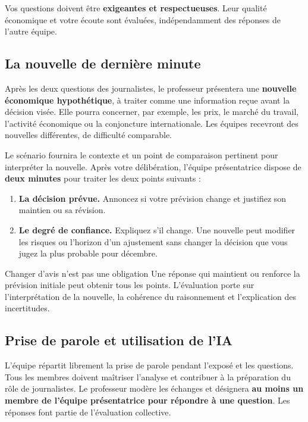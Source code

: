\documentclass[11pt,letterpaper]{article}
\begin{document}
Vos questions doivent être \textbf{exigeantes et respectueuses}. Leur qualité économique et votre écoute sont évaluées, indépendamment des réponses de l'autre équipe.

\newpage
\subsection{La nouvelle de dernière minute}
Après les deux questions des journalistes, le professeur présentera une \textbf{nouvelle économique hypothétique}, à traiter comme une information reçue avant la décision visée. Elle pourra concerner, par exemple, les prix, le marché du travail, l'activité économique ou la conjoncture internationale. Les équipes recevront des nouvelles différentes, de difficulté comparable.

Le scénario fournira le contexte et un point de comparaison pertinent pour interpréter la nouvelle. Après votre délibération, l'équipe présentatrice dispose de \textbf{deux minutes} pour traiter les deux points suivants :
\begin{enumerate}
  \item \textbf{La décision prévue.} Annoncez si votre prévision change et justifiez son maintien ou sa révision.
  \item \textbf{Le degré de confiance.} Expliquez s'il change. Une nouvelle peut modifier les risques ou l'horizon d'un ajustement sans changer la décision que vous jugez la plus probable pour décembre.
\end{enumerate}

\begin{pointcle}{Changer d'avis n'est pas une obligation}
Une réponse qui maintient ou renforce la prévision initiale peut obtenir tous les points. L'évaluation porte sur l'interprétation de la nouvelle, la cohérence du raisonnement et l'explication des incertitudes.
\end{pointcle}

\subsection{Prise de parole et utilisation de l'IA}
L'équipe répartit librement la prise de parole pendant l'exposé et les questions. Tous les membres doivent maîtriser l'analyse et contribuer à la préparation du rôle de journalistes. Le professeur modère les échanges et désignera \textbf{au moins un membre de l'équipe présentatrice pour répondre à une question}. Les réponses font partie de l'évaluation collective.
\end{document}
